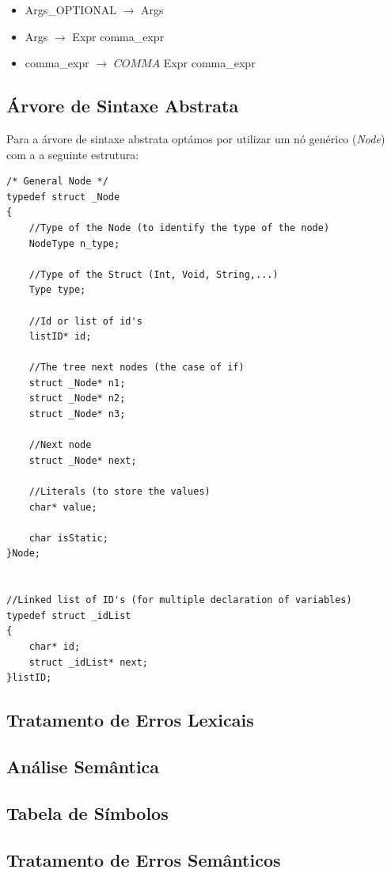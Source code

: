 \documentclass[12pt]{article}
\begin{document}
\begin{itemize}
  \item[] Args\_OPTIONAL $\longrightarrow$ Args
  \\
  \item[] Args $\longrightarrow$ Expr comma\_expr
  \\
  \item[] comma\_expr $\longrightarrow$ $COMMA$ Expr comma\_expr               
  
  
\end{itemize}


\subsection{Árvore de Sintaxe Abstrata}

Para a árvore de sintaxe abstrata optámos por utilizar um nó genérico (\emph{Node}) com a a seguinte estrutura: 


\begin{lstlisting}
/* General Node */
typedef struct _Node
{
    //Type of the Node (to identify the type of the node)
	NodeType n_type;

    //Type of the Struct (Int, Void, String,...)
	Type type;

    //Id or list of id's
    listID* id;

    //The tree next nodes (the case of if)
    struct _Node* n1;
    struct _Node* n2;
    struct _Node* n3;

    //Next node
    struct _Node* next;

    //Literals (to store the values)
    char* value;

    char isStatic;
}Node;


//Linked list of ID's (for multiple declaration of variables)
typedef struct _idList
{
	char* id;
	struct _idList* next;
}listID;

\end{lstlisting}
 


\subsection{Tratamento de Erros Lexicais}

\subsection{Análise Semântica}

\subsection{Tabela de Símbolos}

\subsection{Tratamento de Erros Semânticos}









	
	
\end{document}
